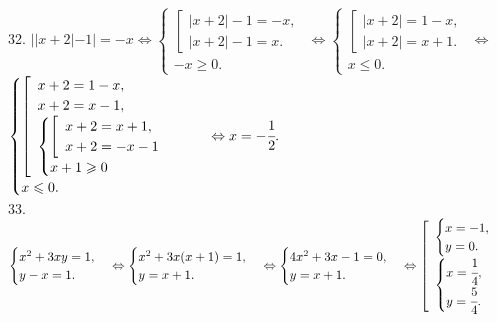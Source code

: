 32. $||x+2|-1|=-x\Leftrightarrow\begin{cases}\left[\begin{array}{l}|x+2|-1=-x,\\ |x+2|-1=x.\end{array}\right.\\ -x\geqslant0.\end{cases}
\Leftrightarrow\begin{cases}\left[\begin{array}{l}|x+2|=1-x,\\ |x+2|=x+1.\end{array}\right.\\ x\leqslant0.\end{cases}
\Leftrightarrow$\\$ \begin{cases}\left[\begin{array}{l}x+2=1-x,\\ x+2=x-1,\\ \begin{cases}\left[\begin{array}{l}x+2=x+1,\\ x+2=-x-1\end{array}\right.\\ x+1\geqslant0\end{cases}\end{array}\right.\\ x\leqslant0.\end{cases}\Leftrightarrow x=-\cfrac{1}{2}.$\\
33. $\begin{cases} x^2+3xy=1,\\ y-x=1.\end{cases}\Leftrightarrow\begin{cases} x^2+3x(x+1)=1,\\ y=x+1.\end{cases}
\Leftrightarrow\begin{cases} 4x^2+3x-1=0,\\ y=x+1.\end{cases}\Leftrightarrow\left[\begin{array}{l}\begin{cases} x=-1,\\ y=0.\end{cases}\\ \begin{cases} x=\cfrac{1}{4},\\ y=\cfrac{5}{4}.\end{cases}\end{array}\right.$\\
